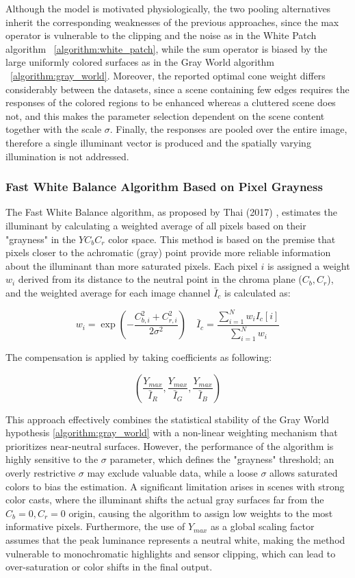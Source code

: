 Although the model is motivated physiologically, the two pooling alternatives inherit the corresponding weaknesses of the previous approaches, since the max operator is vulnerable to the clipping and the noise as in the White Patch algorithm ~\ref{algorithm:white_patch}, while the sum operator is biased by the large uniformly colored surfaces as in the Gray World algorithm ~\ref{algorithm:gray_world}. Moreover, the reported optimal cone weight differs considerably between the datasets, since a scene containing few edges requires the responses of the colored regions to be enhanced whereas a cluttered scene does not, and this makes the parameter selection dependent on the scene content together with the scale $\sigma$. Finally, the responses are pooled over the entire image, therefore a single illuminant vector is produced and the spatially varying illumination is not addressed.

\subsubsection{Fast White Balance Algorithm Based on Pixel Grayness}
\label{algorithm:fast_wb_grayness}

The Fast White Balance algorithm, as proposed by Thai (2017) \cite{fast_wb_greyness}, estimates the illuminant by calculating a weighted average of all pixels based on their "grayness" in the $YC_bC_r$ color space. This method is based on the premise that pixels closer to the achromatic (gray) point provide more reliable information about the illuminant than more saturated pixels. Each pixel $i$ is assigned a weight $w_i$ derived from its distance to the neutral point in the chroma plane ($C_b, C_r$), and the weighted average for each image channel $\bar{I}_c$ is calculated as:

\begin{equation}
w_i = \exp\left( -\frac{C_{b,i}^2 + C_{r,i}^2}{2\sigma^2} \right) \quad \bar{I}_c = \frac{\sum_{i=1}^{N} w_i I_c[i]}{\sum_{i=1}^{N} w_i}
\end{equation}

The compensation is applied by taking coefficients as following:

\[
\left( \frac{Y_{max}}{\bar{I}_R}, \frac{Y_{max}}{\bar{I}_G}, \frac{Y_{max}}{\bar{I}_B} \right)
\]

This approach effectively combines the statistical stability of the Gray World hypothesis \ref{algorithm:gray_world} with a non-linear weighting mechanism that prioritizes near-neutral surfaces. However, the performance of the algorithm is highly sensitive to the $\sigma$ parameter, which defines the "grayness" threshold; an overly restrictive $\sigma$ may exclude valuable data, while a loose $\sigma$ allows saturated colors to bias the estimation. A significant limitation arises in scenes with strong color casts, where the illuminant shifts the actual gray surfaces far from the $C_b=0, C_r=0$ origin, causing the algorithm to assign low weights to the most informative pixels. Furthermore, the use of $Y_{max}$ as a global scaling factor assumes that the peak luminance represents a neutral white, making the method vulnerable to monochromatic highlights and sensor clipping, which can lead to over-saturation or color shifts in the final output.

